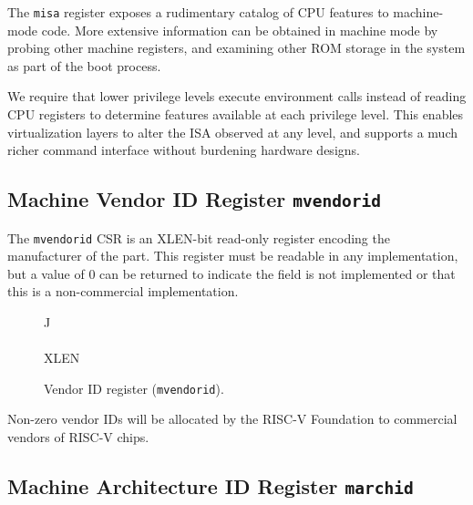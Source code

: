 \begin{commentary}
The {\tt misa} register exposes a rudimentary catalog of CPU features
to machine-mode code.  More extensive information can be obtained in
machine mode by probing other machine registers, and examining other
ROM storage in the system as part of the boot process.

We require that lower privilege levels execute environment calls
instead of reading CPU registers to determine features available at
each privilege level. This enables virtualization layers to alter the
ISA observed at any level, and supports a much richer command
interface without burdening hardware designs.
\end{commentary}


\clearpage

\subsection{Machine Vendor ID Register {\tt mvendorid}}

The {\tt mvendorid} CSR is an XLEN-bit read-only register encoding the
manufacturer of the part.  This register must be readable in any
implementation, but a value of 0 can be returned to indicate the field
is not implemented or that this is a non-commercial implementation.

\begin{figure*}[h!]
{\footnotesize
\begin{center}
\begin{tabular}{J}
 \\
\hline
{} \\
\hline
XLEN \\
\end{tabular}
\end{center}
}
\vspace{-0.1in}
\caption{Vendor ID register ({\tt mvendorid}).}
\label{mvendorreg}
\end{figure*}

\begin{commentary}
Non-zero vendor IDs will be allocated by the RISC-V Foundation to commercial
vendors of RISC-V chips.
\end{commentary}

\subsection{Machine Architecture ID Register {\tt marchid}}

